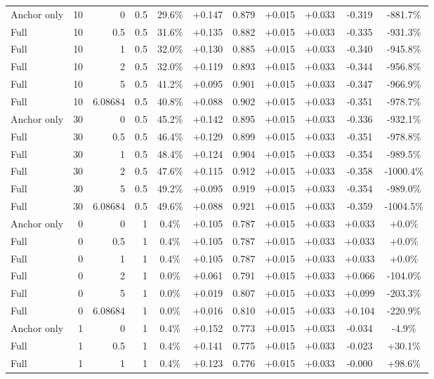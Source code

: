 \begin{table}[htbp]
\begin{tabular}{lrrrccccccc}
Anchor only & 10 & 0 & 0.5 & 29.6\% & +0.147 & 0.879 & +0.015 & +0.033 & -0.319 & -881.7\% \\
Full & 10 & 0.5 & 0.5 & 31.6\% & +0.135 & 0.882 & +0.015 & +0.033 & -0.335 & -931.3\% \\
Full & 10 & 1 & 0.5 & 32.0\% & +0.130 & 0.885 & +0.015 & +0.033 & -0.340 & -945.8\% \\
Full & 10 & 2 & 0.5 & 32.0\% & +0.119 & 0.893 & +0.015 & +0.033 & -0.344 & -956.8\% \\
Full & 10 & 5 & 0.5 & 41.2\% & +0.095 & 0.901 & +0.015 & +0.033 & -0.347 & -966.9\% \\
Full & 10 & 6.08684 & 0.5 & 40.8\% & +0.088 & 0.902 & +0.015 & +0.033 & -0.351 & -978.7\% \\
Anchor only & 30 & 0 & 0.5 & 45.2\% & +0.142 & 0.895 & +0.015 & +0.033 & -0.336 & -932.1\% \\
Full & 30 & 0.5 & 0.5 & 46.4\% & +0.129 & 0.899 & +0.015 & +0.033 & -0.351 & -978.8\% \\
Full & 30 & 1 & 0.5 & 48.4\% & +0.124 & 0.904 & +0.015 & +0.033 & -0.354 & -989.5\% \\
Full & 30 & 2 & 0.5 & 47.6\% & +0.115 & 0.912 & +0.015 & +0.033 & -0.358 & -1000.4\% \\
Full & 30 & 5 & 0.5 & 49.2\% & +0.095 & 0.919 & +0.015 & +0.033 & -0.354 & -989.0\% \\
Full & 30 & 6.08684 & 0.5 & 49.6\% & +0.088 & 0.921 & +0.015 & +0.033 & -0.359 & -1004.5\% \\
Anchor only & 0 & 0 & 1 & 0.4\% & +0.105 & 0.787 & +0.015 & +0.033 & +0.033 & +0.0\% \\
Full & 0 & 0.5 & 1 & 0.4\% & +0.105 & 0.787 & +0.015 & +0.033 & +0.033 & +0.0\% \\
Full & 0 & 1 & 1 & 0.4\% & +0.105 & 0.787 & +0.015 & +0.033 & +0.033 & +0.0\% \\
Full & 0 & 2 & 1 & 0.0\% & +0.061 & 0.791 & +0.015 & +0.033 & +0.066 & -104.0\% \\
Full & 0 & 5 & 1 & 0.0\% & +0.019 & 0.807 & +0.015 & +0.033 & +0.099 & -203.3\% \\
Full & 0 & 6.08684 & 1 & 0.0\% & +0.016 & 0.810 & +0.015 & +0.033 & +0.104 & -220.9\% \\
Anchor only & 1 & 0 & 1 & 0.4\% & +0.152 & 0.773 & +0.015 & +0.033 & -0.034 & -4.9\% \\
Full & 1 & 0.5 & 1 & 0.4\% & +0.141 & 0.775 & +0.015 & +0.033 & -0.023 & +30.1\% \\
Full & 1 & 1 & 1 & 0.4\% & +0.123 & 0.776 & +0.015 & +0.033 & -0.000 & +98.6\% \\

\end{tabular}
\end{table}
